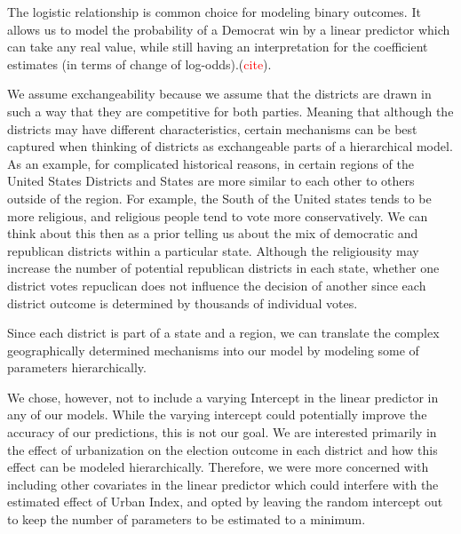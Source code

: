\documentclass[12pt]{article}
\begin{document}
The logistic relationship is common choice for modeling binary outcomes. It allows us to model the probability of a Democrat win by a linear predictor which can take any real value, while still having an interpretation for the coefficient estimates (in terms of change of log-odds).(\textcolor{red}{cite}).


We assume exchangeability because we assume that the districts are drawn in such a way that they are competitive for both parties. Meaning that although the districts may have different characteristics, certain mechanisms can be best captured when thinking of districts as exchangeable parts of  a hierarchical model. 
As an example, for complicated historical reasons, in certain regions of the United States Districts and States are more similar to each other to others outside of the region. For example, the South of the United states tends to be more religious, and religious people tend to vote more conservatively. We can think about this then as a prior telling us about the mix of democratic and republican districts within a particular state. Although the religiousity may increase the number of potential republican districts in each state, whether one district votes repuclican does not influence the decision of another since each district outcome is determined by thousands of individual votes. 

Since each district is part of a state and a region, we can translate the complex geographically determined mechanisms into our model by modeling some of parameters hierarchically.



We chose, however, not to include a varying Intercept in the linear predictor in any of our models. While the varying intercept could potentially improve the accuracy of our predictions, this is not our goal. We are interested primarily in the effect of urbanization on the election outcome in each district and how this effect can be modeled hierarchically. Therefore, we were more concerned with including other covariates in the linear predictor which could interfere with the estimated effect of Urban Index, and opted by leaving the random intercept out to keep the number of parameters to be estimated to a minimum.

\end{document}
